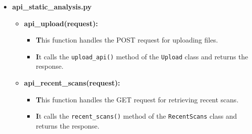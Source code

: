 \documentclass{report}
\begin{document}
\begin{itemize}
\begin{itemize}
\begin{itemize}
                    \item \textbf{RestApiAuthMiddleware}:
                        \begin{itemize}
                            \item \textbf This class serves as middleware for handling API authentication.
                            \item \textbf It intercepts incoming requests and checks if they are API requests.
                            \item \textbf If the request method is 'OPTIONS', it returns a response with status 200 for CORS pre-flight requests.
                            \item \textbf It checks API authentication using the \texttt{api\_auth} function and returns a 401 response for unauthorized requests.
                        \end{itemize}
                \end{itemize}

            \item \textbf{api\_static\_analysis.py}
                \begin{itemize}
                  \item \textbf{api\_upload(request):}
                    \begin{itemize}
                      \item \textbf This function handles the POST request for uploading files.
                      \item \textbf It calls the \texttt{upload\_api()} method of the \texttt{Upload} class and returns the response.
                    \end{itemize}
                  
                  \item \textbf{api\_recent\_scans(request):}
                    \begin{itemize}
                      \item \textbf This function handles the GET request for retrieving recent scans.
                      \item \textbf It calls the \texttt{recent\_scans()} method of the \texttt{RecentScans} class and returns the response.
                    \end{itemize}
                  

\end{itemize}
\end{itemize}
\end{itemize}
\end{document}
